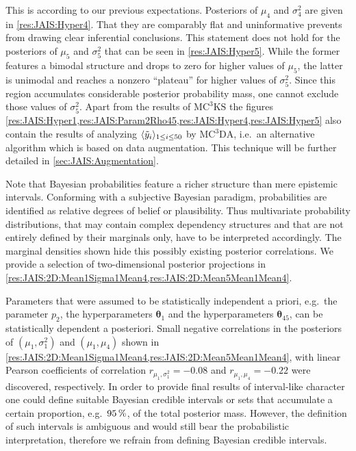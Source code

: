 This is according to our previous expectations.
Posteriors of \(\mu_4\) and \(\sigma^2_4\) are given in \cref{res:JAIS:Hyper4}.
That they are comparably flat and uninformative prevents from drawing clear inferential conclusions.
This statement does not hold for the posteriors of \(\mu_5\) and \(\sigma^2_5\) that can be seen in \cref{res:JAIS:Hyper5}.
While the former features a bimodal structure and drops to zero for higher values of \(\mu_5\), the latter is unimodal and reaches a nonzero ``plateau'' for higher values of \(\sigma^2_5\).
Since this region accumulates considerable posterior probability mass, one cannot exclude those values of \(\sigma^2_5\).
Apart from the results of \(\text{MC}^3\text{KS}\) the figures \cref{res:JAIS:Hyper1,res:JAIS:Param2Rho45,res:JAIS:Hyper4,res:JAIS:Hyper5} also contain the results of analyzing \(\langle{\tilde{y}_i}\rangle_{1 \leq i \leq 50}\)
by \(\text{MC}^3\text{DA}\), i.e.\ an alternative algorithm which is based on data augmentation.
This technique will be further detailed in \cref{sec:JAIS:Augmentation}.
\par %
Note that Bayesian probabilities feature a richer structure than mere epistemic intervals.
Conforming with a subjective Bayesian paradigm, probabilities are identified as relative degrees of belief or plausibility.
Thus multivariate probability distributions, that may contain complex dependency structures
and that are not entirely defined by their marginals only, have to be interpreted accordingly.
The marginal densities shown hide this possibly existing posterior correlations.
We provide a selection of two-dimensional posterior projections in \cref{res:JAIS:2D:Mean1Sigma1Mean4,res:JAIS:2D:Mean5Mean1Mean4}.
\par %
Parameters that were assumed to be statistically independent a priori,
e.g.\ the parameter \(p_2\), the hyperparameters \(\bm{\theta}_1\) and the hyperparameters \(\bm{\theta}_{45}\),
can be statistically dependent a posteriori.
Small negative correlations in the posteriors of \((\mu_1,\sigma^2_1)\) and \((\mu_1,\mu_4)\) shown in \cref{res:JAIS:2D:Mean1Sigma1Mean4,res:JAIS:2D:Mean5Mean1Mean4},
with linear Pearson coefficients of correlation \(r_{\mu_1,\sigma^2_1} = -0.08\) and \(r_{\mu_1,\mu_4} = -0.22\) were discovered, respectively.
In order to provide final results of interval-like character one could define suitable Bayesian credible intervals or sets that accumulate a certain proportion, e.g.\ \(\unit[95]{\%}\), of the total posterior mass.
However, the definition of such intervals is ambiguous and would still bear the probabilistic interpretation, therefore we refrain from defining Bayesian credible intervals.

